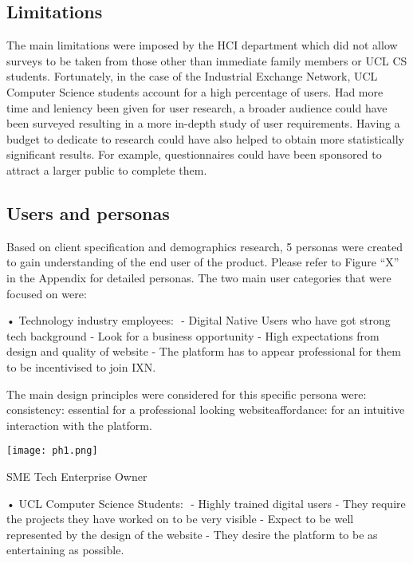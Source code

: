 \documentclass[fontsize=11pt]{extarticle}
\numberwithin{figure}{section} %
\begin{document}
\hypertarget{limitations}{%
\subsection{Limitations}\label{limitations}}

The main limitations were imposed by the HCI department which did not
allow surveys to be taken from those other than immediate family members
or UCL CS students. Fortunately, in the case of the Industrial Exchange
Network, UCL Computer Science students account for a high percentage of
users. Had more time and leniency been given for user research, a
broader audience could have been surveyed resulting in a more in-depth
study of user requirements. Having a budget to dedicate to research
could have also helped to obtain more statistically significant results.
For example, questionnaires could have been sponsored to attract a
larger public to complete them.

\hypertarget{users-and-personas}{%
\subsection{Users and personas}\label{users-and-personas}}

Based on client specification and demographics research, 5 personas were
created to gain understanding of the end user of the product. Please
refer to Figure ``X'' in the Appendix for detailed personas. The two
main user categories that were focused on were: ​

• Technology industry employees: ​ - Digital Native Users who have got
strong tech background​ - Look for a business opportunity​ - High
expectations from design and quality of website​ - The platform has to
appear professional for them to be incentivised to join IXN​.

The main design principles were considered for this specific persona
were: ​ consistency: essential for a professional looking website​
affordance: for an intuitive interaction with the platform. ​

\begin{table}[H]
      \centering
      \texttt{[image: ph1.png]}
      \caption{SME Tech Enterprise Owner}
\end{table}

• UCL Computer Science Students: ​ - Highly trained digital users​ -
They require the projects they have worked on to be very visible​ -
Expect to be well represented by the design of the website​ - They
desire the platform to be as entertaining as possible. ​
\end{document}
